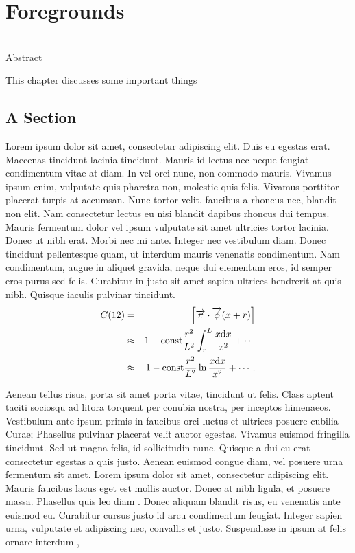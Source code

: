 \chapter{Foregrounds}

\begin{bf}
  \author{Emma Chapman (Imperial College London), Vibor Jelić, (Ruđer Bošković Institute)}\\
  
Abstract\\
\end{bf}

This chapter discusses some important things


\section{A Section}

Lorem ipsum dolor sit amet, consectetur adipiscing elit. Duis eu egestas erat. Maecenas tincidunt lacinia tincidunt. Mauris id lectus nec neque feugiat condimentum vitae at diam. In vel orci nunc, non commodo mauris. Vivamus ipsum enim, vulputate quis pharetra non, molestie quis felis. Vivamus porttitor placerat turpis at accumsan. Nunc tortor velit, faucibus a rhoncus nec, blandit non elit. Nam consectetur lectus eu nisi blandit dapibus rhoncus dui tempus. Mauris fermentum dolor vel ipsum vulputate sit amet ultricies tortor lacinia. Donec ut nibh erat. Morbi nec mi ante. Integer nec vestibulum diam. Donec tincidunt pellentesque quam, ut interdum mauris venenatis condimentum. Nam condimentum, augue in aliquet gravida, neque dui elementum eros, id semper eros purus sed felis. Curabitur in justo sit amet sapien ultrices hendrerit at quis nibh. Quisque iaculis pulvinar tincidunt. 
\begin{eqnarray}
C(12) &= &\left[\overrightarrow{\pi}\cdot\overrightarrow{\phi}(x+r)\right] \nonumber \\ 
&\approx& 1-\mathrm{const}\frac{r^2}{L^2}\int_r^L\frac{x\mathrm{d} x}{x^2} + \cdots \nonumber  \\
&\approx& 1-\mathrm{const}\frac{r^2}{L^2}\ln\frac{x\mathrm{d} x}{x^2} + \cdots .\label{brokenlongeqn}
\end{eqnarray}

Aenean tellus risus, porta sit amet porta vitae, tincidunt ut felis. Class aptent taciti sociosqu ad litora torquent per conubia nostra, per inceptos himenaeos. Vestibulum ante ipsum primis in faucibus orci luctus et ultrices posuere cubilia Curae; Phasellus pulvinar placerat velit auctor egestas. Vivamus euismod fringilla tincidunt. Sed ut magna felis, id sollicitudin nunc. Quisque a dui eu erat consectetur egestas a quis justo. Aenean euismod congue diam, vel posuere urna fermentum sit amet. Lorem ipsum dolor sit amet, consectetur adipiscing elit. Mauris faucibus lacus eget est mollis auctor. Donec at nibh ligula, et posuere massa. Phasellus quis leo diam \cite{diamantaras1996pcn}.
Donec aliquam blandit risus, eu venenatis ante euismod eu. Curabitur cursus justo id arcu condimentum feugiat. Integer sapien urna, vulputate et adipiscing nec, convallis et justo. Suspendisse in ipsum at felis ornare interdum \cite{tulone2006pts},

